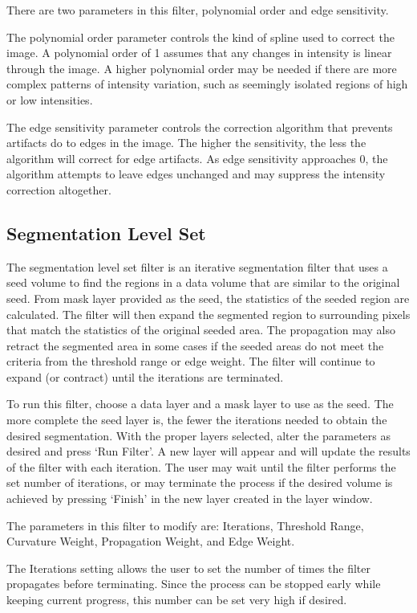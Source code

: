 \documentclass[fleqn,11pt,openany]{book}
\begin{document}
There are two parameters in this filter, polynomial order and edge sensitivity.  

The polynomial order parameter controls the kind of spline used to correct the image.  A polynomial order of 1 assumes that any changes in intensity is linear through the image.  A higher polynomial order may be needed if there are more complex patterns of intensity variation, such as seemingly isolated regions of high or low intensities.  

The edge sensitivity parameter controls the correction algorithm that prevents artifacts do to edges in the image.  The higher the sensitivity, the less the algorithm will correct for edge artifacts.  As edge sensitivity approaches 0, the algorithm attempts to leave edges unchanged and may suppress the intensity correction altogether.  

\subsection{Segmentation Level Set}

The segmentation level set filter is an iterative segmentation filter that uses a seed volume to find the regions in a data volume that are similar to the original seed.  From mask layer provided as the seed, the statistics of the seeded region are calculated.  The filter will then expand the segmented region to surrounding pixels that match the statistics of the original seeded area.  The propagation may also retract the segmented area in some cases if the seeded areas do not meet the criteria from the threshold range or edge weight.  The filter will continue to expand (or contract) until the iterations are terminated.  

To run this filter, choose a data layer and a mask layer to use as the seed.  The more complete the seed layer is, the fewer the iterations needed to obtain the desired segmentation.  With the proper layers selected, alter the parameters as desired and press `Run Filter'.  A new layer will appear and will update the results of the filter with each iteration.  The user may wait until the filter performs the set number of iterations, or may terminate the process if the desired volume is achieved by pressing `Finish' in the new layer created in the layer window.  

The parameters in this filter to modify are: Iterations, Threshold Range, Curvature Weight, Propagation Weight, and Edge Weight.

The Iterations setting allows the user to set the number of times the filter propagates before terminating.  Since the process can be stopped early while keeping current progress, this number can be set very high if desired.
\end{document}
